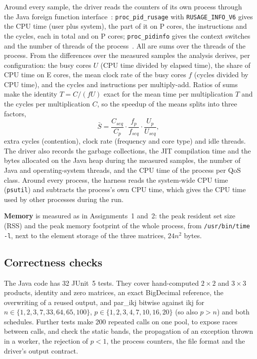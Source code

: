 \documentclass[11pt,a4paper]{article}
\begin{document}
Around every sample, the driver reads the counters of its own process through
the Java foreign function interface~\cite{jep454}:
\texttt{proc\_pid\_rusage} with \texttt{RUSAGE\_INFO\_V6} gives the CPU time
(user plus system), the part of it on P cores, the instructions and the cycles,
each in total and on P cores; \texttt{proc\_pidinfo} gives the context switches
and the number of threads of the process~\cite{macsdk}. All are sums over the
threads of the process. From the differences over the measured samples the
analysis derives, per configuration: the busy cores $U$ (CPU time divided by
elapsed time), the share of CPU time on E cores, the mean clock rate of the
busy cores $f$ (cycles divided by CPU time), and the cycles and instructions
per multiply-add. Ratios of sums make the identity $T=C/(fU)$ exact for the mean
time per multiplication $T$ and the cycles per multiplication $C$, so the
speedup of the means splits into three factors,
\[
\bar S=\frac{C_{seq}}{C_p}\cdot\frac{f_p}{f_{seq}}\cdot\frac{U_p}{U_{seq}},
\]
extra cycles (contention), clock rate (frequency and core type) and idle
threads. The driver also records the garbage collections, the JIT compilation
time and the bytes allocated on the Java heap during the measured samples, the
number of Java and operating-system threads, and the CPU time of the process
per QoS class. Around every process, the harness reads the system-wide CPU time
(\texttt{psutil}) and subtracts the process's own CPU time, which gives the CPU
time used by other processes during the run.

\textbf{Memory} is measured as in Assignments~1 and~2: the peak resident set
size (RSS) and the peak memory footprint of the whole process, from
\texttt{/usr/bin/time -l}, next to the element storage of the three matrices,
$24n^2$ bytes.

\subsection{Correctness checks}
\label{sec:correctness}

The Java code has 32 JUnit~5 tests. They cover hand-computed $2\times2$ and
$3\times3$ products, identity and zero matrices, an exact BigDecimal reference,
the overwriting of a reused output, and par\_ikj bitwise against ikj for
$n\in\{1,2,3,7,33,64,65,100\}$, $p\in\{1,2,3,4,7,10,16,20\}$ (so also $p>n$)
and both schedules. Further tests make 200 repeated calls on one pool, to
expose races between calls, and check the static bands, the propagation of an
exception thrown in a worker, the rejection of $p<1$, the process counters, the
file format and the driver's output contract.
\end{document}

